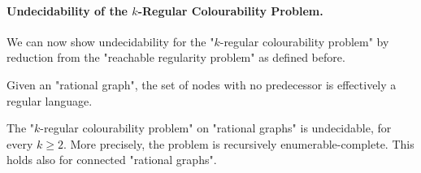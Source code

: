 \paragraph*{Undecidability of the $k$-Regular Colourability Problem.}
We can now show undecidability for the "$k$-regular colourability problem" by reduction from the "reachable regularity problem" as defined before.

\begin{fact}
    \AP\label{fact:initial-nodes-are-regular}
    Given an "rational graph", the set of nodes with no predecessor is effectively a regular language. 
\end{fact}

\begin{theorem}
    \AP\label{thm:k-reg-col-undec}
    The "$k$-regular colourability problem" on "rational graphs" is undecidable, for every $k\geq 2$. More precisely, the problem is recursively enumerable-complete. This holds also for connected "rational graphs".
\end{theorem}


